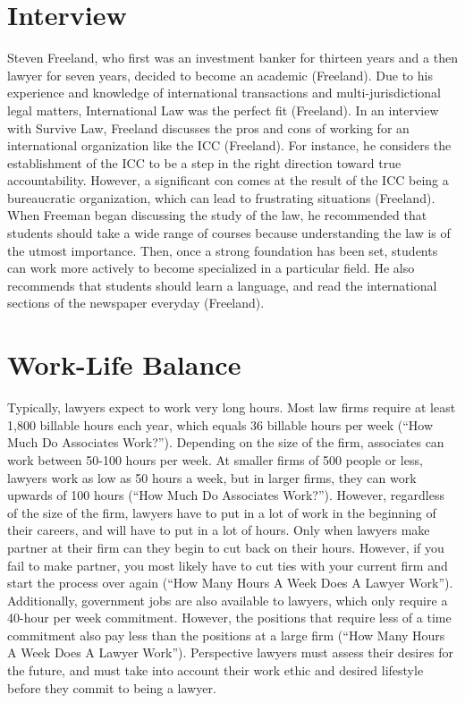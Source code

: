 \section{Interview}
    Steven Freeland, who first was an investment banker for thirteen years and a then lawyer for seven years, decided to become an academic (Freeland). Due to his experience and knowledge of international transactions and multi-jurisdictional legal matters, International Law was the perfect fit (Freeland). In an interview with Survive Law, Freeland discusses the pros and cons of working for an international organization like the ICC (Freeland). For instance, he considers the establishment of the ICC to be a step in the right direction toward true accountability. However, a significant con comes at the result of the ICC being a bureaucratic organization, which can lead to frustrating situations (Freeland). When Freeman began discussing the study of the law, he recommended that students should take a wide range of courses because understanding the law is of the utmost importance. Then, once a strong foundation has been set, students can work more actively to become specialized in a particular field. He also recommends that students should learn a language, and read the international sections of the newspaper everyday (Freeland).
\section{Work-Life Balance}
    Typically, lawyers expect to work very long hours. Most law firms require at least 1,800 billable hours each year, which equals 36 billable hours per week (“How Much Do Associates Work?”). Depending on the size of the firm, associates can work between 50-100 hours per week. At smaller firms of 500 people or less, lawyers work as low as 50 hours a week, but in larger firms, they can work upwards of 100 hours (“How Much Do Associates Work?”). However, regardless of the size of the firm, lawyers have to put in a lot of work in the beginning of their careers, and will have to put in a lot of hours. Only when lawyers make partner at their firm can they begin to cut back on their hours. However, if you fail to make partner, you most likely have to cut ties with your current firm and start the process over again (“How Many Hours A Week Does A Lawyer Work”). Additionally, government jobs are also available to lawyers, which only require a 40-hour per week commitment. However, the positions that require less of a time commitment also pay less than the positions at a large firm (“How Many Hours A Week Does A Lawyer Work”). Perspective lawyers must assess their desires for the future, and must take into account their work ethic and desired lifestyle before they commit to being a lawyer.

